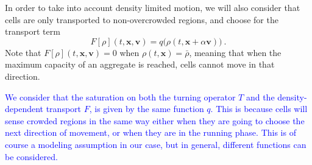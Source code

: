 \documentclass{article}
\newcommand {\bv} { {\mathbf{v}} }
\newcommand {\bx} { {\mathbf{x}} }
\begin{document}
In order to take into account density limited motion, we will also consider that cells are only transported to non-overcrowded regions, and choose for the transport term
\begin{equation*}
F[\rho](t,\mathbf{x},\mathbf{v}) = q\big(\rho(t,\mathbf{x}+\alpha \mathbf{v})\big)\ .
\end{equation*}
Note that $F[\rho](t,\bx,\bv)=0$ when $\rho(t,\bx)=\bar{\rho}$, meaning that when the maximum capacity of an aggregate is reached, cells cannot move in that direction.

\textcolor{blue}{We consider that the saturation on both the turning operator $T$ and the density-dependent transport $F$, is given by the same function $q$. This is because cells will sense crowded regions in the same way either when they are going to choose the next direction of movement, or when they are in the running phase. This is of course a modeling assumption in our case, but in general, different functions can be considered.}
\end{document}
